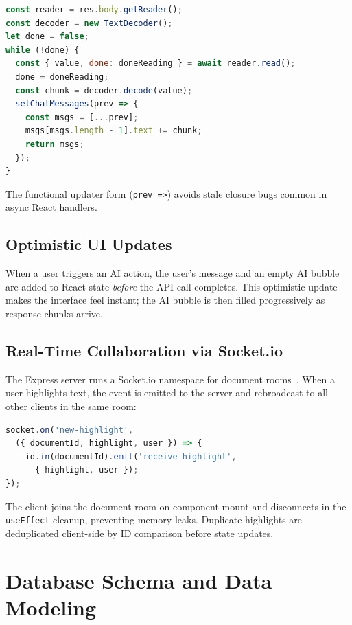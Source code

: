 \documentclass[conference]{IEEEtran}
\begin{document}
\begin{lstlisting}[language=JavaScript, caption={Stream-reading loop on the client}]
const reader = res.body.getReader();
const decoder = new TextDecoder();
let done = false;
while (!done) {
  const { value, done: doneReading } = await reader.read();
  done = doneReading;
  const chunk = decoder.decode(value);
  setChatMessages(prev => {
    const msgs = [...prev];
    msgs[msgs.length - 1].text += chunk;
    return msgs;
  });
}
\end{lstlisting}

The functional updater form (\texttt{prev =>}) avoids stale closure bugs common in async React handlers.

\subsection{Optimistic UI Updates}

When a user triggers an AI action, the user's message and an empty AI bubble are added to React state \emph{before} the API call completes. This optimistic update makes the interface feel instant; the AI bubble is then filled progressively as response chunks arrive.

\subsection{Real-Time Collaboration via Socket.io}

The Express server runs a Socket.io namespace for document rooms~\cite{socketio2024}. When a user highlights text, the event is emitted to the server and rebroadcast to all other clients in the same room:

\begin{lstlisting}[language=JavaScript, caption={Socket.io highlight broadcast}]
socket.on('new-highlight',
  ({ documentId, highlight, user }) => {
    io.in(documentId).emit('receive-highlight',
      { highlight, user });
});
\end{lstlisting}

The client joins the document room on component mount and disconnects in the \texttt{useEffect} cleanup, preventing memory leaks. Duplicate highlights are deduplicated client-side by ID comparison before state updates.

\section{Database Schema and Data Modeling}
\label{sec:db}
\end{document}
